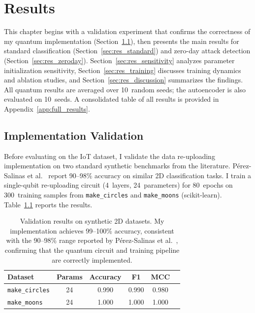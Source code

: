 \chapter{Results}
\label{chap:results}

This chapter begins with a validation experiment that confirms the correctness of my quantum implementation (Section~\ref{sec:res_validation}), then presents the main results for standard classification (Section~\ref{sec:res_standard}) and zero-day attack detection (Section~\ref{sec:res_zeroday}). Section~\ref{sec:res_sensitivity} analyzes parameter initialization sensitivity, Section~\ref{sec:res_training} discusses training dynamics and ablation studies, and Section~\ref{sec:res_discussion} summarizes the findings. All quantum results are averaged over 10~random seeds; the autoencoder is also evaluated on 10~seeds. A consolidated table of all results is provided in Appendix~\ref{app:full_results}.

\section{Implementation Validation}
\label{sec:res_validation}

Before evaluating on the IoT dataset, I validate the data re-uploading implementation on two standard synthetic benchmarks from the literature. P\'erez-Salinas et al.~\cite{perez2020data} report 90--98\% accuracy on similar 2D classification tasks. I train a single-qubit re-uploading circuit (4~layers, 24~parameters) for 80~epochs on 300~training samples from \texttt{make\_circles} and \texttt{make\_moons} (scikit-learn). Table~\ref{tab:res_validation} reports the results.

\begin{table}[ht]
\centering
\begin{tabular}{lccccc}
    \toprule
    \textbf{Dataset} & \textbf{Params} & \textbf{Accuracy} & \textbf{F1} & \textbf{MCC} \\
    \midrule
    \texttt{make\_circles} & 24 & 0.990 & 0.990 & 0.980 \\
    \texttt{make\_moons}   & 24 & 1.000 & 1.000 & 1.000 \\
    \bottomrule
\end{tabular}
\caption{Validation results on synthetic 2D datasets. My implementation achieves 99--100\% accuracy, consistent with the 90--98\% range reported by P\'erez-Salinas et al.~\cite{perez2020data}, confirming that the quantum circuit and training pipeline are correctly implemented.}
\label{tab:res_validation}
\end{table}

